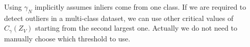 \documentclass{article}
\begin{document}
Using $\gamma_N$ implicitly assumes inliers come from one class.
If we are required to detect outliers in a multi-class dataset, we can use other critical values of $C_{\gamma}(Z_V)$ starting from the second largest one. Actually we do not need to manually choose which threshold to use.
\end{document}
